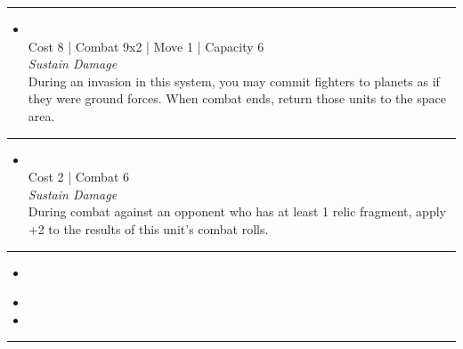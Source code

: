 \begin{multicols}{2}
\vspace{-10pt}\rule{\hsize}{0.4pt}\vspace{5pt}


\begin{itemize}
\item {}\\
Cost 8 | Combat 9x2 | Move 1 | Capacity 6 \\
\emph{Sustain Damage}\\
During an invasion in this system, you may commit fighters to planets as if they were ground forces. When combat ends, return those units to the space area.
\end{itemize}

\vspace{-10pt}\rule{\hsize}{0.4pt}\vspace{5pt}


\begin{itemize}
\item {}
\\
Cost 2 | Combat 6 \\
\emph{Sustain Damage}\\
During combat against an opponent who has at least 1 relic fragment, apply +2 to the results of this unit's combat rolls. 
\end{itemize}

\vspace{-10pt}\rule{\hsize}{0.4pt}\vspace{5pt}


\begin{itemize}
\item \crystalFighterI
\end{itemize}

\columnbreak
{}

\begin{itemize}
\item \crystalFighterI
\item \neuroglaive
\end{itemize}

\vspace{-10pt}\rule{\hsize}{0.4pt}\vspace{5pt}


\end{multicols}
